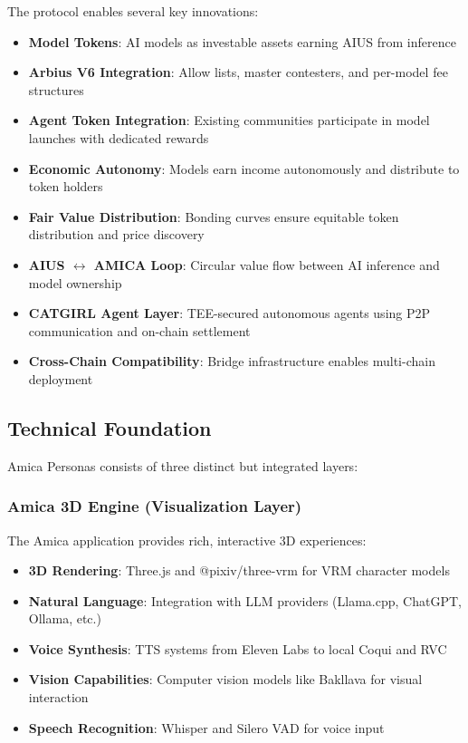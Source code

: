 \documentclass{article}
\begin{document}
The protocol enables several key innovations:

\begin{itemize}
    \item \textbf{Model Tokens}: AI models as investable assets earning AIUS from inference
    \item \textbf{Arbius V6 Integration}: Allow lists, master contesters, and per-model fee structures
    \item \textbf{Agent Token Integration}: Existing communities participate in model launches with dedicated rewards
    \item \textbf{Economic Autonomy}: Models earn income autonomously and distribute to token holders
    \item \textbf{Fair Value Distribution}: Bonding curves ensure equitable token distribution and price discovery
    \item \textbf{AIUS $\leftrightarrow$ AMICA Loop}: Circular value flow between AI inference and model ownership
    \item \textbf{CATGIRL Agent Layer}: TEE-secured autonomous agents using P2P communication and on-chain settlement
    \item \textbf{Cross-Chain Compatibility}: Bridge infrastructure enables multi-chain deployment
\end{itemize}

\subsection{Technical Foundation}

Amica Personas consists of three distinct but integrated layers:

\subsubsection{Amica 3D Engine (Visualization Layer)}

The Amica application provides rich, interactive 3D experiences:
\begin{itemize}
    \item \textbf{3D Rendering}: Three.js and @pixiv/three-vrm for VRM character models
    \item \textbf{Natural Language}: Integration with LLM providers (Llama.cpp, ChatGPT, Ollama, etc.)
    \item \textbf{Voice Synthesis}: TTS systems from Eleven Labs to local Coqui and RVC
    \item \textbf{Vision Capabilities}: Computer vision models like Bakllava for visual interaction
    \item \textbf{Speech Recognition}: Whisper and Silero VAD for voice input
\end{itemize}
\end{document}
